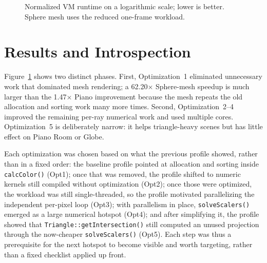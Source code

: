 \documentclass[sigplan,screen]{acmart}
\begin{document}
\begin{figure}[t]
\centering
{}
\caption{Normalized VM runtime on a logarithmic scale; lower is better.
Sphere mesh uses the reduced one-frame workload.}
\label{fig:runtimes}
\end{figure}

\section{Results and Introspection}

Figure~\ref{fig:runtimes} shows two distinct phases. First, Optimization~1
eliminated unnecessary work that dominated mesh rendering; a 62.20$\times$
Sphere-mesh speedup is much larger than the 1.47$\times$ Piano improvement
because the mesh repeats the old allocation and sorting work many more
times. Second, Optimization~2--4 improved the remaining per-ray numerical
work and used multiple cores. Optimization~5 is deliberately narrow: it
helps triangle-heavy scenes but has little effect on Piano Room or Globe.

Each optimization was chosen based on what the previous profile showed,
rather than in a fixed order: the baseline profile pointed at allocation and
sorting inside \texttt{calcColor()} (Opt1); once that was removed, the
profile shifted to numeric kernels still compiled without optimization
(Opt2); once those were optimized, the workload was still single-threaded,
so the profile motivated parallelizing the independent per-pixel loop
(Opt3); with parallelism in place, \texttt{solveScalers()} emerged as a
large numerical hotspot (Opt4); and after simplifying it, the profile showed
that \texttt{Triangle::getIntersection()} still computed an unused
projection through the now-cheaper \texttt{solveScalers()} (Opt5). Each step
was thus a prerequisite for the next hotspot to become visible and worth
targeting, rather than a fixed checklist applied up front.
\end{document}
